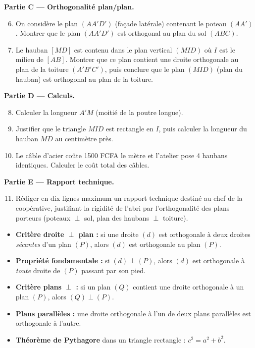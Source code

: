 \documentclass[11pt]{article}
\newcounter{popsec}
\newcounter{popsub}
\newcommand{\courssub}[1]{%
  \stepcounter{popsub}%
  \par\vspace{9pt}\noindent{\popxbold\fontsize{11.5}{13}\selectfont\color{popink}{\color{poporange}\thepopsec.\thepopsub}\hspace{6pt}#1}\par\nopagebreak\vspace{4pt}
}
\begin{document}
\textbf{Partie C — Orthogonalité plan/plan.}
\begin{enumerate}
    \setcounter{enumi}{5}
    \item On considère le plan $(AA'D')$ (façade latérale) contenant le poteau $(AA')$. Montrer que le plan $(AA'D')$ est orthogonal au plan du sol $(ABC)$.
    \item Le hauban $[MD]$ est contenu dans le plan vertical $(MID)$ où $I$ est le milieu de $[AB]$. Montrer que ce plan contient une droite orthogonale au plan de la toiture $(A'B'C')$, puis conclure que le plan $(MID)$ (plan du hauban) est orthogonal au plan de la toiture.
\end{enumerate}

\textbf{Partie D — Calculs.}
\begin{enumerate}
    \setcounter{enumi}{7}
    \item Calculer la longueur $A'M$ (moitié de la poutre longue).
    \item Justifier que le triangle $MID$ est rectangle en $I$, puis calculer la longueur du hauban $MD$ au centimètre près.
    \item Le câble d'acier coûte \num{1500} FCFA le mètre et l'atelier pose 4 haubans identiques. Calculer le coût total des câbles.
\end{enumerate}

\textbf{Partie E — Rapport technique.}
\begin{enumerate}
    \setcounter{enumi}{10}
    \item Rédiger en dix lignes maximum un rapport technique destiné au chef de la coopérative, justifiant la rigidité de l'abri par l'orthogonalité des plans porteurs (poteaux $\perp$ sol, plan des haubans $\perp$ toiture).
\end{enumerate}

\courssub{Ressources à mobiliser}

\begin{aretenir}
\begin{itemize}
    \item \textbf{Critère droite $\perp$ plan :} si une droite $(d)$ est orthogonale à deux droites \emph{sécantes} d'un plan $(P)$, alors $(d)$ est orthogonale au plan $(P)$.
    \item \textbf{Propriété fondamentale :} si $(d) \perp (P)$, alors $(d)$ est orthogonale à \emph{toute} droite de $(P)$ passant par son pied.
    \item \textbf{Critère plans $\perp$ :} si un plan $(Q)$ contient une droite orthogonale à un plan $(P)$, alors $(Q) \perp (P)$.
    \item \textbf{Plans parallèles :} une droite orthogonale à l'un de deux plans parallèles est orthogonale à l'autre.
    \item \textbf{Théorème de Pythagore} dans un triangle rectangle : $c^2 = a^2 + b^2$.
\end{itemize}
\end{aretenir}
\end{document}
